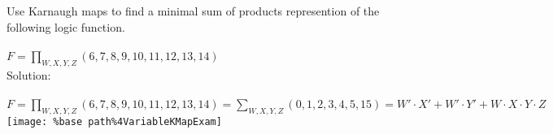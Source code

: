 Use Karnaugh maps to find a minimal sum of products represention of the following logic function.\\ \\
$F=\prod_{W,X,Y,Z}(6,7,8,9,10,11,12,13,14)$\\

Solution: \\ \\
$F=\prod_{W,X,Y,Z}(6,7,8,9,10,11,12,13,14)=\sum_{W,X,Y,Z}(0,1,2,3,4,5,15)=W' \cdot X' + W' \cdot Y' + W \cdot X \cdot Y \cdot Z$\\
\texttt{[image: \%base path\%4VariableKMapExam]}\\ \\
